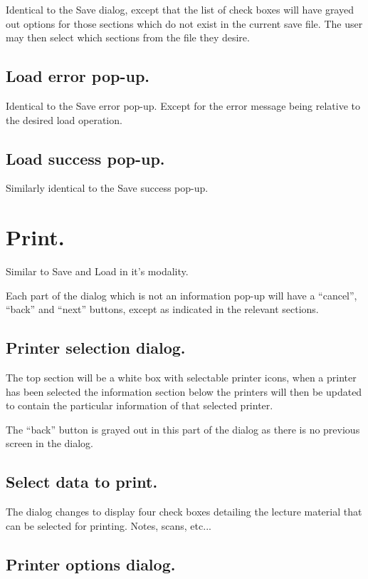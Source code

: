 Identical to the Save dialog, except that the list of check boxes will have grayed out options for those sections which do not exist in the current save file. The user may then select which sections from the file they desire.

\subsection{Load error pop-up.}

Identical to the Save error pop-up. Except for the error message being relative to the desired load operation.

\subsection{Load success pop-up.}

Similarly identical to the Save success pop-up.

\section{Print.}

Similar to Save and Load in it's modality.

Each part of the dialog which is not an information pop-up will have a ``cancel'', ``back'' and ``next'' buttons, except as indicated in the relevant sections.

\subsection{Printer selection dialog.}

The top section will be a white box with selectable printer icons, when a printer has been selected the information section below the printers will then be updated to contain the particular information of that selected printer.

The ``back'' button is grayed out in this part of the dialog as there is no previous screen in the dialog.

\subsection{Select data to print.}

The dialog changes to display four check boxes detailing the lecture material that can be selected for printing. Notes, scans, etc...

\subsection{Printer options dialog.}


